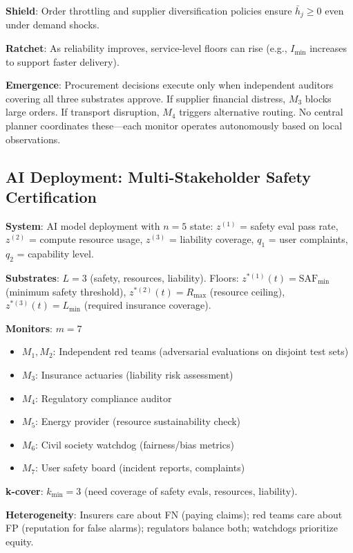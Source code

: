 \documentclass[11pt,a4paper]{article}
\begin{document}
\textbf{Shield}: Order throttling and supplier diversification policies ensure $\bar{h}_j \geq 0$ even under demand shocks.

\textbf{Ratchet}: As reliability improves, service-level floors can rise (e.g., $I_{\min}$ increases to support faster delivery).

\textbf{Emergence}: Procurement decisions execute only when independent auditors covering all three substrates approve. If supplier financial distress, $M_3$ blocks large orders. If transport disruption, $M_4$ triggers alternative routing. No central planner coordinates these—each monitor operates autonomously based on local observations.

\subsection{AI Deployment: Multi-Stakeholder Safety Certification}

\textbf{System}: AI model deployment with $n=5$ state: $z^{(1)}$ = safety eval pass rate, $z^{(2)}$ = compute resource usage, $z^{(3)}$ = liability coverage, $q_1$ = user complaints, $q_2$ = capability level.

\textbf{Substrates}: $L=3$ (safety, resources, liability). Floors: $z^{*(1)}(t) = \text{SAF}_{\min}$ (minimum safety threshold), $z^{*(2)}(t) = R_{\max}$ (resource ceiling), $z^{*(3)}(t) = L_{\min}$ (required insurance coverage).

\textbf{Monitors}: $m=7$
\begin{itemize}
\item $M_1, M_2$: Independent red teams (adversarial evaluations on disjoint test sets)
\item $M_3$: Insurance actuaries (liability risk assessment)
\item $M_4$: Regulatory compliance auditor
\item $M_5$: Energy provider (resource sustainability check)
\item $M_6$: Civil society watchdog (fairness/bias metrics)
\item $M_7$: User safety board (incident reports, complaints)
\end{itemize}

\textbf{k-cover}: $k_{\min} = 3$ (need coverage of safety evals, resources, liability).

\textbf{Heterogeneity}: Insurers care about FN (paying claims); red teams care about FP (reputation for false alarms); regulators balance both; watchdogs prioritize equity.
\end{document}
